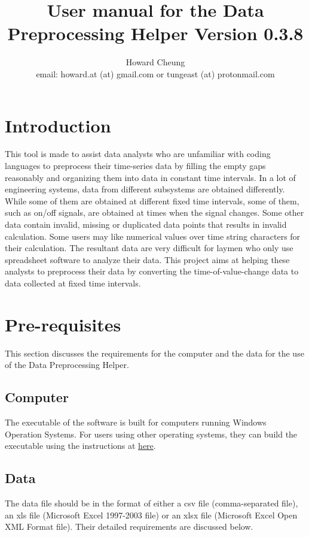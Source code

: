 \documentclass[12pt,a4paper]{article}
\author{Howard Cheung \\ email: howard.at (at) gmail.com or tungeast (at) protonmail.com}
\title{User manual for the Data Preprocessing Helper Version 0.3.8}
\begin{document}
\maketitle

\tableofcontents

\section{Introduction}

This tool is made to assist data analysts who are unfamiliar with coding languages to preprocess their time-series data by filling the empty gaps reasonably and organizing them into data in constant time intervals.
In a lot of engineering systems, data from different subsystems are obtained differently.
While some of them are obtained at different fixed time intervals, some of them, such as on/off signals, are obtained at times when the signal changes.
Some other data contain invalid, missing or duplicated data points that results in invalid calculation.
Some users may like numerical values over time string characters for their calculation.
The resultant data are very difficult for laymen who only use spreadsheet software to analyze their data.
This project aims at helping these analysts to preprocess their data by converting the time-of-value-change data to data collected at fixed time intervals.

\section{Pre-requisites}
This section discusses the requirements for the computer and the data for the use of the Data Preprocessing Helper.

\subsection{Computer}
The executable of the software is built for computers running Windows Operation Systems.
For users using other operating systems, they can build the executable using the instructions at \href{https://github.com/howardcheung/data-preprocessing-helper/blob/master/exe/README.md}{here}.

\subsection{Data}
The data file should be in the format of either a csv file (comma-separated file), an xls file (Microsoft Excel 1997-2003 file) or an xlsx file (Microsoft Excel Open XML Format file). Their detailed requirements are discussed below.
\end{document}
